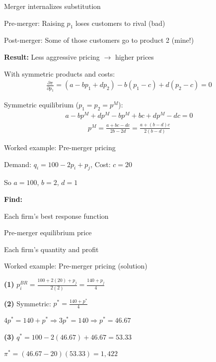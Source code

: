 \documentclass[notes,11pt, aspectratio=169]{beamer}
\newenvironment{wideitemize}{\itemize\addtolength{\itemsep}{10pt}}{\enditemize}
\newenvironment{wideenumerate}{\enumerate\addtolength{\itemsep}{10pt}}{\endenumerate}
\begin{document}
\begin{frame}{Merger internalizes substitution}
	\begin{wideitemize}
		\item Pre-merger: Raising $p_1$ loses customers to rival (bad)
		\item Post-merger: Some of those customers go to product 2 (mine!)
		\item \textbf{Result:} Less aggressive pricing $\rightarrow$ higher prices
		\item With symmetric products and costs:
		\begin{align*}
			\frac{\partial \pi}{\partial p_1} = (a - bp_1 + dp_2) - b(p_1 - c) + d(p_2 - c) = 0
		\end{align*}
		\item Symmetric equilibrium ($p_1 = p_2 = p^M$):
		\begin{align*}
			a - bp^M + dp^M - bp^M + bc + dp^M - dc = 0
		\end{align*}
		\begin{align*}
			p^M = \frac{a + bc - dc}{2b - 2d} = \frac{a + (b-d)c}{2(b - d)}
		\end{align*}
	\end{wideitemize}
\end{frame}

\begin{frame}{Worked example: Pre-merger pricing}
	\begin{wideitemize}
		\item Demand: $q_i = 100 - 2p_i + p_j$, Cost: $c = 20$
		\item So $a = 100$, $b = 2$, $d = 1$
		\item \textbf{Find:}
		\begin{wideenumerate}
			\item Each firm's best response function
			\item Pre-merger equilibrium price
			\item Each firm's quantity and profit
		\end{wideenumerate}
	\end{wideitemize}
\end{frame}

\begin{frame}{Worked example: Pre-merger pricing (solution)}
	\begin{wideitemize}
		\item \textbf{(1)} $p_i^{BR} = \frac{100 + 2(20) + p_j}{2(2)} = \frac{140 + p_j}{4}$
		\item \textbf{(2)} Symmetric: $p^* = \frac{140 + p^*}{4}$
		\item $4p^* = 140 + p^* \Rightarrow 3p^* = 140 \Rightarrow p^* = 46.67$
		\item \textbf{(3)} $q^* = 100 - 2(46.67) + 46.67 = 53.33$
		\item $\pi^* = (46.67 - 20)(53.33) = 1,422$
	\end{wideitemize}
\end{frame}
\end{document}
